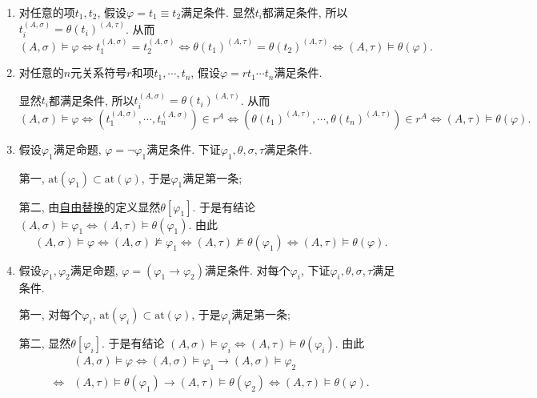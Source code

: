 \documentclass[UTF8]{ctexart}
\begin{document}
\begin{enumerate}
    \item 对任意的项$t_1,t_2$, 假设$\varphi=t_1\equiv t_2$满足条件.
    显然$t_i$都满足条件, 所以$t_i^{(A,\sigma)}=\theta(t_i)^{(A,\tau)}$. 从而
    \[
        (A,\sigma)\models\varphi\iff t_1^{(A,\sigma)}=t_2^{(A,\sigma)}\iff
        \theta(t_1)^{(A,\tau)}=\theta(t_2)^{(A,\tau)}\iff
        (A,\tau)\models\theta(\varphi).
    \]

    \item 对任意的$n$元关系符号$r$和项$t_1,\cdots,t_n$,
    假设$\varphi=rt_1\cdots t_n$满足条件.

    \hspace{2.17em}
    显然$t_i$都满足条件, 所以$t_i^{(A,\sigma)}=\theta(t_i)^{(A,\tau)}$. 从而
    \[
        (A,\sigma)\models\varphi\iff
        (t_1^{(A,\sigma)},\cdots,t_n^{(A,\sigma)})\in r^A\iff
        (\theta(t_1)^{(A,\tau)},\cdots,\theta(t_n)^{(A,\tau)})\in r^A\iff
        (A,\tau)\models\theta(\varphi).
    \]

    \item 假设$\varphi_1$满足命题, $\varphi=\neg\varphi_1$满足条件.
    下证$\varphi_1,\theta,\sigma,\tau$满足条件.

    \hspace{2.17em}
    第一, $\mathrm{at}(\varphi_1)\subset\mathrm{at}(\varphi)$,
    于是$\varphi_1$满足第一条;
    
    \hspace{2.17em}
    第二, 由\href{../../01 一阶语言/04 一般替换#nameddest=sec:定义1.4}
    {自由替换}的定义显然$\theta[\varphi_1]$. 于是有结论
    $(A,\sigma)\models\varphi_1\iff(A,\tau)\models\theta(\varphi_1)$. 由此
    \[
        (A,\sigma)\models\varphi\iff(A,\sigma)\not\models\varphi_1\iff
        (A,\tau)\not\models\theta(\varphi_1)\iff(A,\tau)\models\theta(\varphi).
    \]

    \item 假设$\varphi_1,\varphi_2$满足命题, $\varphi=(\varphi_1\to\varphi_2)$满足条件.
    对每个$\varphi_i$, 下证$\varphi_i,\theta,\sigma,\tau$满足条件.

    \hspace{2.17em}
    第一, 对每个$\varphi_i$, $\mathrm{at}(\varphi_i)\subset\mathrm{at}(\varphi)$,
    于是$\varphi_i$满足第一条;
    
    \hspace{2.17em}
    第二, 显然$\theta[\varphi_i]$. 于是有结论
    $(A,\sigma)\models\varphi_i\iff(A,\tau)\models\theta(\varphi_i)$. 由此
    \[\begin{aligned}
        &(A,\sigma)\models\varphi\iff
        (A,\sigma)\models\varphi_1\to(A,\sigma)\models\varphi_2\\[-3pt]
        \iff&(A,\tau)\models\theta(\varphi_1)\to(A,\tau)\models\theta(\varphi_2)
        \iff(A,\tau)\models\theta(\varphi).
    \end{aligned}\]


\end{enumerate}
\end{document}
